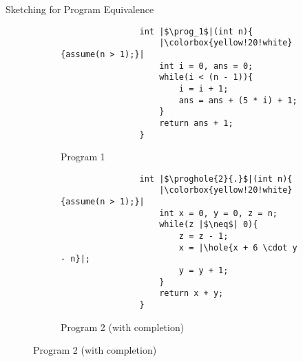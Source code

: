 \begin{frame}[fragile]{Sketching for Program Equivalence}
    \begin{figure}[t]
        \begin{subfigure}{0.48\textwidth}
            \begin{verbatim}
                int |$\prog_1$|(int n){
                    |\colorbox{yellow!20!white}{assume(n > 1);}|
                    int i = 0, ans = 0;
                    while(i < (n - 1)){
                        i = i + 1;
                        ans = ans + (5 * i) + 1;
                    }
                    return ans + 1;
                }
            \end{verbatim}
            \caption{Program 1 \label{list:p1}}
        \end{subfigure}
        \begin{subfigure}{0.48\textwidth}
            \begin{verbatim}
                int |$\proghole{2}{.}$|(int n){
                    |\colorbox{yellow!20!white}{assume(n > 1);}|
                    int x = 0, y = 0, z = n;
                    while(z |$\neq$| 0){
                        z = z - 1;
                        x = |\hole{x + 6 \cdot y - n}|;
                        y = y + 1;
                    }
                    return x + y;
                }
            \end{verbatim}
            \caption{Program 2 (with completion)\label{list:p2}}
        \end{subfigure}
    \end{figure}
\end{frame}
